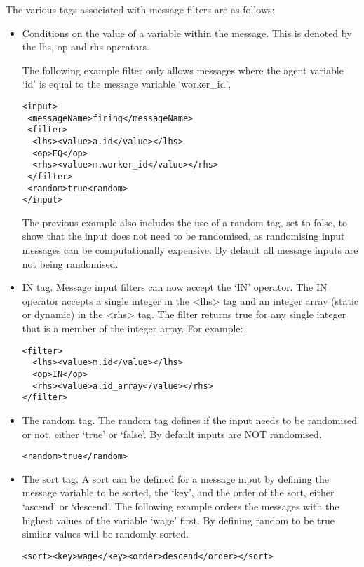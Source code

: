 The various tags associated with message filters are as follows:
\begin{itemize}
\item Conditions on the value of a variable within the message. This
is denoted by the lhs, op and rhs operators.

The following example filter only allows messages where the agent
variable `id' is equal to the message variable `worker\_id',

\begin{mylisting}
\begin{verbatim}
<input>
 <messageName>firing</messageName>
 <filter>
  <lhs><value>a.id</value></lhs>
  <op>EQ</op>
  <rhs><value>m.worker_id</value></rhs>
 </filter>
 <random>true<random>
</input>
\end{verbatim}
\end{mylisting}

The previous example also includes the use of a random tag, set to
false, to show that the input does not need to be randomised, as
randomising input messages can be computationally expensive. By
default all message inputs are not being randomised.

\item IN tag. Message input filters can now accept the `IN' operator.
The IN operator accepts a single integer in the <lhs> tag and an integer array
(static or dynamic) in the <rhs> tag. The filter returns true for any single integer
that is a member of the integer array. For example:
\begin{mylisting}
\begin{verbatim}
<filter>
  <lhs><value>m.id</value></lhs>
  <op>IN</op>
  <rhs><value>a.id_array</value></rhs>
</filter>
\end{verbatim}
\end{mylisting}
\item The random tag. The random tag defines if the input needs to be randomised or not, either `true' or
`false'. By default inputs are NOT randomised.
\begin{mylisting}
\begin{verbatim}
<random>true</random>
\end{verbatim}
\end{mylisting}
\item The sort tag. A sort can be defined for a message input by defining the message variable to be sorted, the `key',
and the order of the sort, either `ascend' or `descend'. The following example orders the messages with the highest values of the variable `wage' first.
By defining random to be true similar values will be randomly
sorted.
\begin{mylisting}
\begin{verbatim}
<sort><key>wage</key><order>descend</order></sort>
\end{verbatim}
\end{mylisting}


\end{itemize}




